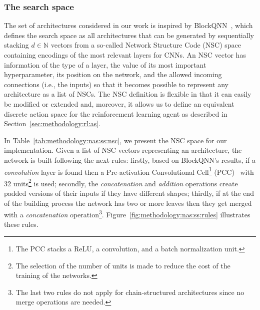 \subsubsection{The search space}\label{sec:methodology:nas:ss}

The set of architectures considered in our work is inspired by BlockQNN~\citep{BlockQNN}, which defines the search space as all architectures that can be generated by sequentially stacking $d \in \mathbb{N}$ vectors from a so-called Network Structure Code (NSC) space containing encodings of the most relevant layers for CNNs. An NSC vector has information of the type of a layer, the value of its most important hyperparameter, its position on the network, and the allowed incoming connections (i.e., the inputs) so that it becomes possible to represent any architecture as a list of NSCs. The NSC definition is flexible in that it can easily be modified or extended and, moreover, it allows us to define an equivalent discrete action space for the reinforcement learning agent as described in Section~\ref{sec:methodology:rl:as}.

In Table~\ref{tab:methodology:nas:ss:nsc}, we present the NSC space for our implementation. Given a list of NSC vectors representing an architecture, the network is built following the next rules: firstly, based on BlockQNN's results, if a \textit{convolution} layer is found then a Pre-activation Convolutional Cell\footnote{The PCC stacks a ReLU, a convolution, and a batch normalization unit.} (PCC)~\citep{PCC} with 32 units\footnote{The selection of the number of units is made to reduce the cost of the training of the networks.} is used; secondly, the \textit{concatenation} and \textit{addition} operations create padded versions of their inputs if they have different shapes; thirdly, if at the end of the building process the network has two or more leaves then they get merged with a \textit{concatenation} operation\footnote{The last two rules do not apply for chain-structured architectures since no merge operations are needed.}. Figure~\ref{fig:methodology:nas:ss:rules} illustrates these rules.

